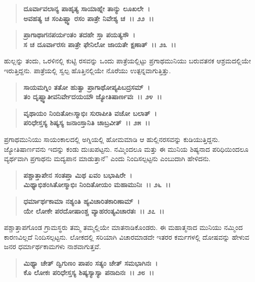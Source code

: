 \begin{verse}
\textbf{ದೂರ್ವಾವಲಾನ್ಯ ಪಾಹೃತ್ಯ ಸಾಯಾಹ್ನೇ ತಾನ್ಯು ಲೂಖಲೇ~।}\\\textbf{ಅವಹತ್ಯ ಚ ಸಂಪಿಷ್ಟ್ವಾ ರಸಂ ಪಾತ್ರೇ ನಿವೇಶ್ಯ ಚ~।। ೨೨~।।}
\end{verse}

\begin{verse}
\textbf{ಪ್ರಾಗಾಥಾಗನಪರ್ಯಂತಂ ತದಹೇ ಸ್ತಾ ಪಯತ್ಯಸೌ~।}\\\textbf{ಸ ಚ ದೂರ್ವಾರಸಃ ಪಾತ್ರೇ ಫೇನಿಲೋ ಜಾಯತೇ ಕ್ಷಣಾತ್~।। ೨೩~।।}
\end{verse}

ಹುಲ್ಲನ್ನು ತಂದು, ಒರಳಿನಲ್ಲಿ ಕುಟ್ಟಿ ರಸವನ್ನು ಒಂದು ಪಾತ್ರೆಯಲ್ಲಿಟ್ಟು ಪ್ರಗಾಥಮುನಿಯು ಬರುವತನಕ ಆಶ್ರಮದಲ್ಲಿಯೇ ಇರುತ್ತಿದ್ದನು. ಪಾತ್ರೆಯಲ್ಲಿ ಸ್ವಲ್ಪ ಹೊತ್ತಿನಲ್ಲಿಯೇ ನೊರೆಯು ಉತ್ಪನ್ನವಾಗುತ್ತಿತ್ತು.

\begin{verse}
\textbf{ಸಾಯಮಗ್ನಿಂ ತತೋ ಹುತ್ವಾ ಪ್ರಾಗಾಥೋಪ್ಯಪಿಬದ್ರಸಮ್~।}\\\textbf{ತಂ ದೃಷ್ಟ್ವಾತೀವನಿರ್ವೇದಯಯೌ ಜ್ಯೋತಿಷಾರ್ಣವಃ~।। ೨೪~।। }
\end{verse}

\begin{verse}
\textbf{ವೃಥಾಯಂ ನಿಂದಿತೋsಸ್ಮಾಭಿಃ ಸುರಾಪೀತಿ ವಚೋ ಬಲಾತ್~।}\\\textbf{ಪರಿಧೇಸ್ತಸ್ಯ ಶಿಷ್ಯಸ್ಯ ಜನಾಂಸ್ತಾನಿತಿ ಚಾಬ್ರವೀತ್~।। ೨೫~।।}
\end{verse}

ಪ್ರಗಾಥಮುನಿಯು ಸಾಯಂಕಾಲದಲ್ಲಿ ಅಗ್ನಿಯಲ್ಲಿ ಹೋಮಮಾಡಿ ಆ ಹುಲ್ಲಿನರಸವನ್ನು ಕುಡಿಯುತ್ತಿದ್ದನು. ಜ್ಯೋತಿಷಾರ್ಣವನು ಇದನ್ನು ಕಂಡು ದುಃಖಪಟ್ಟನು. ನಮ್ಮಿಂದಲೂ ಮತ್ತು ಈ ಮುನಿಯ ಶಿಷ್ಯನಾದ ಪರಿಧಿಯಿಂದಲೂ ವ್ಯರ್ಥವಾಗಿ ಪ್ರಗಾಥನು ಮದ್ಯಪಾನ ಮಾಡುತ್ತಾನೆ” ಎಂದು ನಿಂದಿಸಲ್ಪಟ್ಟನು ಎಂಬುದಾಗಿ ಹೇಳಿದನು.

\begin{verse}
\textbf{ಪಶ್ಚಾತ್ತಾಪೇನ ಸಂತಪ್ತಾ ಮಿಥ ಏವಂ ಬಭಾಷಿರೇ~।}\\\textbf{ಮಿಥ್ಯಾಭಿಶಂಸಿತೋಸ್ಮಾಭಿಃ ನಿಂದಿತೋಯಂ ಮಹಾಮುನಿಃ~।। ೨೬~।।} 
\end{verse}

\begin{verse}
\textbf{ಧರ್ಮಾರ್ಥಕಾಮಾ ನಶ್ಯಂತಿ ಹ್ಯವಿಚಾರಿತಕಾರಿಣಾಮ್~।}\\\textbf{ಯೇ ಲೋಕೇ ಪರದೋಷಾಂಶ್ಚ ವ್ಯಾಹರಂತ್ಯವಿಚಾರತಃ~।। ೨೭~।।}
\end{verse}

ಪಶ್ಚಾತ್ತಾಪಗೊಂಡ ಗ್ರಾಮಸ್ಥರು ತಮ್ಮ ತಮ್ಮಲ್ಲಿಯೇ ಮಾತನಾಡಿಕೊಂಡರು. ಈ ಮಹಾತ್ಮನಾದ ಮುನಿಯು ನಮ್ಮಿಂದ ಕಾರಣವಿಲ್ಲದೆ ನಿಂದಿಸಲ್ಪಟ್ಟನು. ಲೋಕದಲ್ಲಿ ಸರಿಯಾಗಿ ವಿಚಾರಮಾಡದೇ ಇತರರ ಕರ್ಮಗಳಲ್ಲಿ ದೋಷವನ್ನು ಹೇಳುವ ಜನರ ಧರ್ಮಾರ್ಥಕಾಮಗಳು ನಾಶವಾಗುತ್ತವೆ.

\begin{verse}
\textbf{ಮಿಥ್ಯಾ ಚೇತ್ ದ್ವಿಗುಣಂ ಪಾಪಂ ಸತ್ಯಂ ಚೇತ್ ಸಮಭಾಗಿನಃ~।}\\\textbf{ಕೊ ಲೋಕಃ ಪರಿಧೇಸ್ತಸ್ಯ ಶಿಷ್ಯಸ್ಯಾಸ್ಯಾ ಪನಾದಿನಃ~।। ೨೮~।। }
\end{verse}

